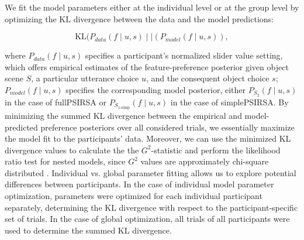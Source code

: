 \documentclass[11pt,a4paper]{article}
\newcommand{\gcs}[1]{\textcolor{blue}{[gcs: #1]}}
\begin{document}

We fit the model parameters either at the individual level or at the group level by optimizing the KL divergence between the data and the model predictions:

\begin{equation}
	\textrm{KL}(P_{data}(f \mid u,s)\mid\mid (P_{model}(f\mid u,s)),
\end{equation}

\noindent where $P_{data}(f\mid u,s)$ specifies a participant's normalized slider value setting, which offers empirical estimates of the feature-preference posterior given object scene $S$, a particular utterance choice $u$, and the consequent object choice $s$;
$P_{model}(f\mid u,s)$ specifies the corresponding model posterior, either $P_{S_{2}}(f\mid u,s)$ in the case of fullPSIRSA or $P_{S_{1\textrm{-simp}}}(f\mid u,s)$ in the case of simplePSIRSA. 
By minimizing the summed KL divergence between the empirical and model-predicted preference posteriors over all considered trials, we essentially maximize the model fit to the participants' data. 
Moreover, we can use the minimized KL divergence values to calculate the the $G^2$-statistic and perform the likelihood ratio test for nested models, since $G^2$ values are approximately chi-square distributed \cite{Lewandowsky:2011}. 
Individual vs. global parameter fitting allows us to explore potential differences between participants.
In the case of individual model parameter optimization, parameters were optimized for each individual participant separately, determining the KL divergence with respect to the participant-specific set of trials. 
In the case of global optimization, all trials of all participants were used to determine the summed KL divergence.
\end{document}
